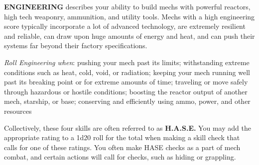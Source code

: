 \textbf{ENGINEERING} describes your ability to build mechs with powerful reactors, high tech weaponry, ammunition, and utility tools. Mechs with a high engineering score typically incorporate a lot of advanced technology, are extremely resilient and reliable, can draw upon huge amounts of energy and heat, and can push their systems far beyond their factory specifications.

\textit{Roll Engineering when}: pushing your mech past its limits; withstanding extreme conditions such as heat, cold, void, or radiation; keeping your mech running well past its breaking point or for extreme amounts of time; traveling or move safely through hazardous or hostile conditions; boosting the reactor output of another mech, starship, or base; conserving and efficiently using ammo, power, and other resources

Collectively, these four skills are often referred to as \textbf{H.A.S.E.} You may add the appropriate rating to a 1d20 roll for the total when making a skill check that calls for one of these ratings. You often make HASE checks as a part of mech combat, and certain actions will call for checks, such as hiding or grappling.